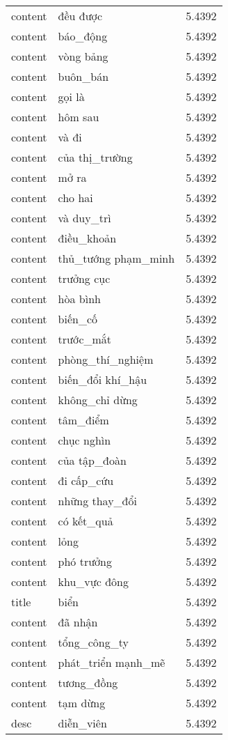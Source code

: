 \documentclass{article}
\begin{document}
\begin{tabular}{lll}
content & đều được & 5.4392\\
content & báo\_động & 5.4392\\
content & vòng bảng & 5.4392\\
content & buôn\_bán & 5.4392\\
content & gọi là & 5.4392\\
content & hôm sau & 5.4392\\
content & và đi & 5.4392\\
content & của thị\_trường & 5.4392\\
content & mở ra & 5.4392\\
content & cho hai & 5.4392\\
content & và duy\_trì & 5.4392\\
content & điều\_khoản & 5.4392\\
content & thủ\_tướng phạm\_minh & 5.4392\\
content & trưởng cục & 5.4392\\
content & hòa bình & 5.4392\\
content & biến\_cố & 5.4392\\
content & trước\_mắt & 5.4392\\
content & phòng\_thí\_nghiệm & 5.4392\\
content & biến\_đổi khí\_hậu & 5.4392\\
content & không\_chỉ dừng & 5.4392\\
content & tâm\_điểm & 5.4392\\
content & chục nghìn & 5.4392\\
content & của tập\_đoàn & 5.4392\\
content & đi cấp\_cứu & 5.4392\\
content & những thay\_đổi & 5.4392\\
content & có kết\_quả & 5.4392\\
content & lỏng & 5.4392\\
content & phó trưởng & 5.4392\\
content & khu\_vực đông & 5.4392\\
title & biển & 5.4392\\
content & đã nhận & 5.4392\\
content & tổng\_công\_ty & 5.4392\\
content & phát\_triển mạnh\_mẽ & 5.4392\\
content & tương\_đồng & 5.4392\\
content & tạm dừng & 5.4392\\
desc & diễn\_viên & 5.4392\\

\end{tabular}
\end{document}
